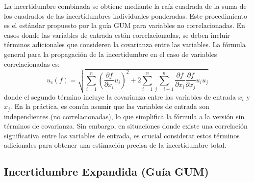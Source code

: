 La incertidumbre combinada se obtiene mediante la raíz cuadrada de la suma de los cuadrados de las incertidumbres individuales ponderadas. Este procedimiento es el estándar propuesto por la guía GUM para variables no correlacionadas. En casos donde las variables de entrada están correlacionadas, se deben incluir términos adicionales que consideren la covarianza entre las variables. La fórmula general para la propagación de la incertidumbre en el caso de variables correlacionadas es:
\[
u_c(f) = \sqrt{\sum_{i=1}^{n} {\left( \frac{\partial f}{\partial x_i} u_i \right)}^2 + 2 \sum_{i=1}^{n} \sum_{j=i+1}^{n} \frac{\partial f}{\partial x_i} \frac{\partial f}{\partial x_j} u_i u_j}
\]
donde el segundo término incluye la covarianza entre las variables de entrada $x_i$ y $x_j$. En la práctica, es común asumir que las variables de entrada son independientes (no correlacionadas), lo que simplifica la fórmula a la versión sin términos de covarianza. Sin embargo, en situaciones donde existe una correlación significativa entre las variables de entrada, es crucial considerar estos términos adicionales para obtener una estimación precisa de la incertidumbre total.

\subsection{Incertidumbre Expandida (Guía GUM)}

